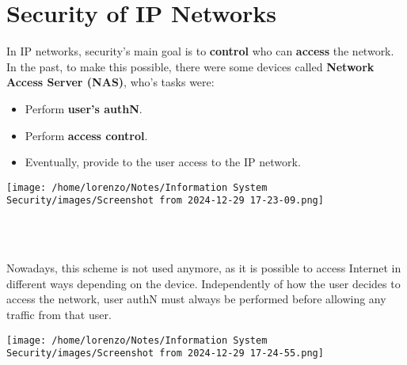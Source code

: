 \chapter{Security of IP Networks}
\begin{minipage}{0.6\textwidth}
In IP networks, security’s main goal is to \textbf{control} who can \textbf{access} the network. In the past,
to make this possible, there were some devices called \textbf{Network Access Server (NAS)}, who’s tasks were: 
\begin{itemize}
    \item Perform \textbf{user's authN}.
    \item Perform \textbf{access control}.
    \item Eventually, provide to the user access to the IP network.
\end{itemize}
\end{minipage} 
\hspace{0.3cm}
\begin{minipage}{0.4\textwidth}
    \centering
    \texttt{[image: /home/lorenzo/Notes/Information System Security/images/Screenshot from 2024-12-29 17-23-09.png]}
\end{minipage}
\\
\\
\noindent
\begin{minipage}{0.6\textwidth}
	\vspace{-2cm}
Nowadays, this scheme is not used anymore, as it is possible to access Internet in different
ways depending on the device. Independently of how the user decides to access the network,
user authN must always be performed before allowing any traffic from that user. 
\end{minipage} 
\hspace{0.4cm}
\begin{minipage}{0.4\textwidth}
    \vspace{0.3cm}
    \centering
    \texttt{[image: /home/lorenzo/Notes/Information System Security/images/Screenshot from 2024-12-29 17-24-55.png]}
\end{minipage}
